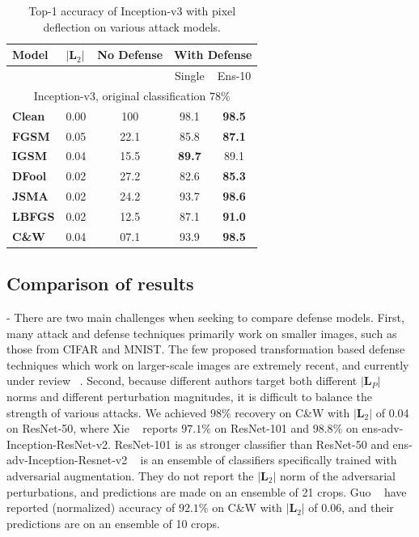  
 \begin{table}[H]
\small
\centering
{}
\begin{tabular}{lcccc}
\textbf{Model} & \multicolumn{1}{l}{$|\boldsymbol{L}_2|$} & \multicolumn{1}{l}{\textbf{No Defense}} & \multicolumn{2}{l}{\textbf{With Defense}} \\ \hline
 & \multicolumn{1}{l}{} & \multicolumn{1}{l}{} & Single & Ens-10 \\ \cline{4-5} 
 \multicolumn{5}{c}{Inception-v3, original classification $78\%$} \\ \hline

\textbf{Clean} & 0.00 & 100 & 98.1 & \textbf{98.5} \\ \hline
\textbf{FGSM} & 0.05 & 22.1 & 85.8 & \textbf{87.1} \\
\textbf{IGSM} & 0.04 & 15.5 & \textbf{89.7} & 89.1 \\
\textbf{DFool} & 0.02 & 27.2 & 82.6 & \textbf{85.3} \\
\textbf{JSMA} & 0.02 & 24.2 & 93.7 & \textbf{98.6} \\
\textbf{LBFGS} & 0.02 & 12.5 & 87.1 & \textbf{91.0} \\
\textbf{C\&W} & 0.04 & 07.1 & 93.9 & \textbf{98.5} \\
\end{tabular}
\caption[Inception-v3 under Pixel Deflection]{Top-1 accuracy of Inception-v3 with pixel deflection on various attack models. 
 \label{tblmodels2}}
\end{table}

\subsection{Comparison of results} - 
There are two main challenges when seeking to compare defense models. 
First, many attack and defense techniques primarily work on smaller images, such as those from CIFAR and MNIST.
The few proposed transformation based defense techniques which work on larger-scale images are extremely recent, and currently under review ~\cite{MitigatingAnon208,CounteringAIGuo17}.
Second, because different authors target both different $|\bm{L}_P|$ norms and different perturbation magnitudes, it is difficult to balance the strength of various attacks.
We achieved $98\%$ recovery on C\&W with $|\bm{L}_2|$ of 0.04 on ResNet-50, where Xie \etal ~\cite{MitigatingAnon208} reports $97.1\%$ on ResNet-101 and $98.8\%$ on ens-adv-Inception-ResNet-v2.
ResNet-101 is as stronger classifier than ResNet-50 and ens-adv-Inception-Resnet-v2 ~\cite{Tramr2017EnsembleAT} is an ensemble of classifiers specifically trained with adversarial augmentation. 
They do not report the $|\bm{L}_2|$ norm of the adversarial perturbations, and predictions are made on an ensemble of 21 crops.
Guo \etal ~\cite{CounteringAIGuo17} have reported (normalized) accuracy of $92.1\%$ on C\&W with $|\bm{L}_2|$ of 0.06, and their predictions are on an ensemble of 10 crops.

